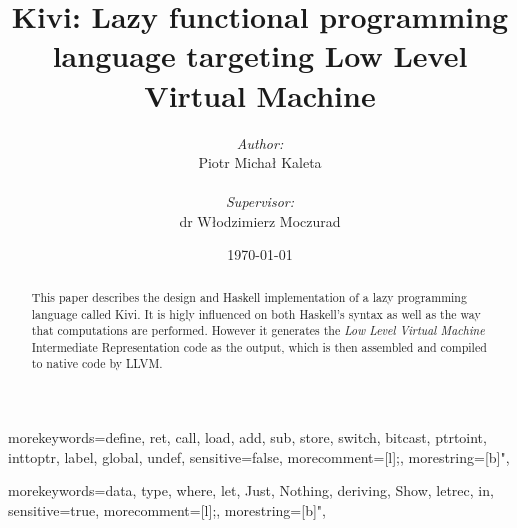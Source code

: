 \documentclass[12pt,a4paper]{report}
\begin{document}

  {morekeywords={define, ret, call, load, add, sub, store, switch, bitcast,
  ptrtoint, inttoptr, label, global, undef},
  sensitive=false,
  morecomment=[l]{;},
  morestring=[b]",
}

  {morekeywords={data, type, where, let, Just, Nothing, deriving, Show, letrec,
  in},
  sensitive=true,
  morecomment=[l]{;},
  morestring=[b]",
}



\title{Kivi: Lazy functional programming language targeting Low Level Virtual Machine}
\author{\textit{Author:}\\Piotr Micha\l{} Kaleta\\\\\emph{Supervisor:}\\dr W\l{}odzimierz Moczurad}
\date{\today}

\maketitle
{}

\newpage
\thispagestyle{empty}
\mbox{}

\Huge
\begin{abstract}
  \normalsize
  \center
  This paper describes the design and Haskell implementation of a lazy
  programming language called Kivi. It is higly influenced on both Haskell's
  syntax as well as the way that computations are performed. However it generates
  the \textit{Low Level Virtual Machine}\cite{website:llvm} Intermediate
  Representation code as the output, which is then assembled and compiled to
  native code by LLVM.
\end{abstract}
\end{document}
